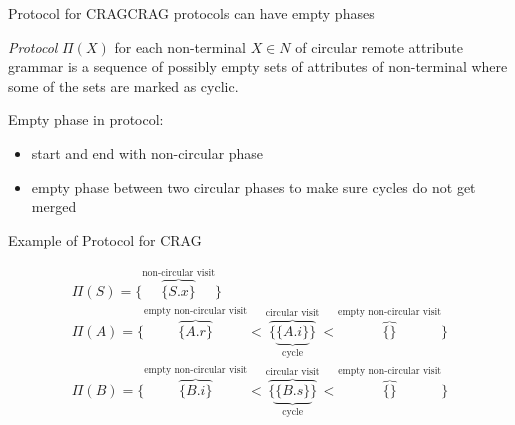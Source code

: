 \begin{frame}{Protocol for CRAG}{CRAG protocols can have empty phases}

\begin{definition}
\emph{Protocol} $\Pi(X)$ for each non-terminal $X \in N$ of circular remote attribute grammar is a \alert{sequence of possibly empty sets} of attributes of non-terminal where some of the sets are marked as cyclic.
\end{definition}

Empty phase in protocol:
\begin{itemize}
    \item start and end with non-circular phase
    \item empty phase between two circular phases to make sure cycles do not get merged
\end{itemize}

\end{frame}





\begin{frame}{Example of Protocol for CRAG}

\begin{equation}\label{eq:protocol-for-crag-example}
\begin{gathered}
\Pi(S) =  \Big \{   \overbrace{\{ S.x \} }^{\text{non-circular visit}}     \Big \} \\
\Pi(A) =  \Big \{  
\overbrace{\big \{  A.r  \big \}}^{\text{empty non-circular visit}} <
\overbrace{\big \{  \underbrace{  \{  A.i  \}}_{\text{cycle}}  \big \}}^{\text{circular visit}} <
\overbrace{\big \{    \big \}}^{\text{empty non-circular visit}}
\Big \} \\
\Pi(B) =  \Big \{
\overbrace{\big \{   B.i  \big \}}^{\text{empty non-circular visit}} <
\overbrace{\big \{  \underbrace{  \{  B.s \}}_{\text{cycle}}  \big \}}^{\text{circular visit}} <
\overbrace{\big \{    \big \}}^{\text{empty non-circular visit}}
\Big \} \\
\end{gathered}
\end{equation}
    
\end{frame}

